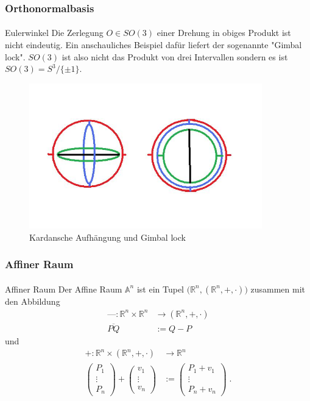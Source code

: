 \documentclass{beamer}
\begin{document}
\begin{frame}
    \frametitle{Orthonormalbasis}
\framesubtitle{}
\begin{block}{Eulerwinkel}
Die  Zerlegung  $O \in SO(3)$  einer Drehung in obiges Produkt ist  nicht eindeutig.
Ein anschauliches Beispiel dafür liefert der sogenannte "Gimbal lock". $SO(3)$ ist also nicht das Produkt von drei Intervallen sondern
es ist $SO(3) = S^{3}/ \{ \pm 1 \}$.

\begin{figure}[H]
    \centering
    \includegraphics[width=0.9\textwidth]{images/gimbalLock.jpg}
    \caption{Kardansche Aufhängung und Gimbal lock}
    \label{fig:gimbal+lock}
\end{figure}

\end{block}

\end{frame}


\begin{frame}
    \frametitle{Affiner Raum}
\framesubtitle{}
\begin{block}{Affiner Raum}
Der Affine Raum $\mathbb{A}^n$ ist ein Tupel $\bigl( \mathbb{R}^n, (\mathbb{R}^n, + , \cdot ) \bigr )$
zusammen mit den Abbildung 
\begin{align*}
\text{---} : \mathbb{R}^n \times \mathbb{R}^n  & \to (\mathbb{R}^n, + , \cdot ) \\
\overline{PQ} & := Q-P  
\end{align*}
und
\begin{align*}
+ : \mathbb{R}^n \times (\mathbb{R}^n, + , \cdot )   & \to  \mathbb{R}^n\\
\begin{pmatrix}
P_1 \\ \vdots \\ P_n
\end{pmatrix} + \begin{pmatrix}
v_1 \\ \vdots \\ v_n
\end{pmatrix} & := \begin{pmatrix}
P_1  + v_1 \\ \vdots \\ P_n + v_n 
\end{pmatrix}   \;.
\end{align*}

\end{block}

\end{frame}
\end{document}
